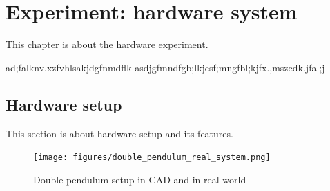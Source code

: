 \chapter{Experiment: hardware system}
This chapter is about the hardware experiment.

ad;falknv.xzfvhlsakjdgfnmdflk asdjgfmndfgb;lkjesf;mngfbl;kjfx.,mszedk.jfal;j

\section{Hardware setup}
This section is about hardware setup and its features.

\begin{figure}[H]
\begin{minipage}[b]{0.45\linewidth}
\centering
{}
\end{minipage}
\begin{minipage}[b]{0.45\linewidth}
\centering
\texttt{[image: figures/double\_pendulum\_real\_system.png]}
\end{minipage}
\caption{Double pendulum setup in CAD and in real world}
\end{figure}

